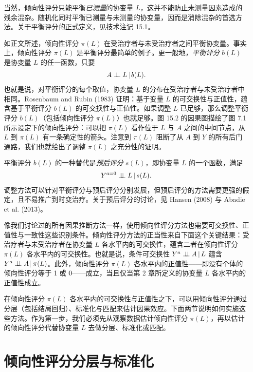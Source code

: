 当然，倾向性评分只能平衡\emph{已测量}的协变量 $L$，这并不能防止未测量因素造成的残余混杂。随机化同时平衡已测量与未测量的协变量，因而是消除混杂的首选方法。关于平衡评分的正式定义，见技术注记 15.1。

\begin{techpoint}[平衡评分与预后评分]
如正文所述，倾向性评分 $\pi(L)$ 在受治疗者与未受治疗者之间平衡协变量。事实上，倾向性评分 $\pi(L)$ 是平衡评分最简单的例子。更一般地，\emph{平衡评分} $b(L)$ 是协变量 $L$ 的任一函数，只要
\[
A\perp\!\!\!\perp L\,|\, b(L).
\]
也就是说，对平衡评分的每个取值，协变量 $L$ 的分布在受治疗者与未受治疗者中相同。Rosenbaum and Rubin (1983) 证明：基于变量 $L$ 的可交换性与正值性，蕴含基于平衡评分 $b(L)$ 的可交换性与正值性。如果调整 $L$ 已足够，那么调整平衡评分 $b(L)$（包括倾向性评分 $\pi(L)$）也就足够。图 15.2 的因果图描绘了图 7.1 所示设定下的倾向性评分：可以把 $\pi(L)$ 看作位于 $L$ 与 $A$ 之间的中间节点，从 $L$ 到 $\pi(L)$ 有一条确定性的箭头。注意到 $\pi(L)$ 阻断了从 $A$ 到 $Y$ 的所有后门通路，我们也就给出了调整 $\pi(L)$ 之充分性的证明。

平衡评分 $b(L)$ 的一种替代是\emph{预后评分} $s(L)$，即协变量 $L$ 的一个函数，满足
\[
Y^{a=0}\perp\!\!\!\perp L\,|\, s(L).
\]
调整方法可以针对平衡评分与预后评分分别发展，但预后评分的方法需要更强的假定，且不易推广到时变治疗。关于预后评分的讨论，见 Hansen (2008) 与 Abadie et al. (2013)。
\end{techpoint}

像我们讨论过的所有因果推断方法一样，使用倾向性评分方法也需要可交换性、正值性与一致性这些识别条件。倾向性评分方法的正当性来自下面这个关键结果：受治疗者与未受治疗者在协变量 $L$ 各水平内的可交换性，蕴含二者在倾向性评分 $\pi(L)$ 各水平内的可交换性。也就是说，条件可交换性 $Y^a\perp\!\!\!\perp A\,|\, L$ 蕴含 $Y^a\perp\!\!\!\perp A\,|\,\pi(L)$。此外，倾向性评分 $\pi(L)$ 各水平内的正值性——即没有个体的倾向性评分等于 1 或 0——成立，当且仅当第 2 章所定义的协变量 $L$ 各水平内的正值性成立。

在倾向性评分 $\pi(L)$ 各水平内的可交换性与正值性之下，可以用倾向性评分通过分层（包括结局回归）、标准化与匹配来估计因果效应。下面两节说明如何实施这些方法。作为第一步，我们必须先从观察数据估计倾向性评分 $\pi(L)$，再以估计的倾向性评分代替协变量 $L$ 去做分层、标准化或匹配。

\section{倾向性评分分层与标准化}

